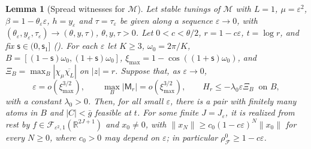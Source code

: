 \documentclass[11pt]{article}
\newtheorem{lemma}[theorem]{Lemma}
\theoremstyle{definition}
\theoremstyle{remark}
\newcommand{\R}{\mathbb R}
\newcommand{\cF}{\mathcal F}
\newcommand{\cM}{\mathcal M}
\newcommand{\norm}[1]{\lVert #1\rVert}
\newcommand{\rhoz}{\rho_{\cF}^{0}}
\begin{document}
\begin{lemma}[Spread witnesses for \(\cM\)]\label{lem:spreadwit}
Let stable tunings of \(\cM\) with \(L=1\), \(\mu=\varepsilon^2\), \(\beta=1-\theta_\varepsilon\varepsilon\), \(h=y_\varepsilon\) and \(\tau=\tau_\varepsilon\) be given along a sequence
\(\varepsilon\to0\), with \((\theta_\varepsilon,y_\varepsilon,\tau_\varepsilon)\to(\theta,y,\tau)\), \(\theta,y,\tau>0\).  Let \(0<c<\theta/2\), \(r=1-c\varepsilon\), \(t=\log r\), and fix
\(\mathsf s\in(0,\mathsf s_1]\) ().  For each \(\varepsilon\) let \(K\ge3\), \(\omega_0=2\pi/K\), \(B=[(1-\mathsf s)\omega_0,(1+\mathsf s)\omega_0]\),
\(\xi_{\max}=1-\cos((1+\mathsf s)\omega_0)\), and \(\Xi_B=\max_B|\chi_\mu\overline{\chi_L}|\) on \(|z|=r\).  Suppose that, as \(\varepsilon\to0\),
\[
\varepsilon=o(\xi_{\max}^{3/2}),\qquad \max_B|\mathsf M_r|=o(\xi_{\max}^{3/2}),\qquad H_r\le-\lambda_0\varepsilon \Xi_B\ \text{ on }B,
\]
with a constant \(\lambda_0>0\).  Then, for all small \(\varepsilon\), there is a pair with finitely many atoms in \(B\) and
\(|C|<\bar g\) feasible at \(t\).  For some finite \(J=J_\varepsilon\), it is realized from rest by
\(f\in\cF_{\varepsilon^2,1}(\R^{2J+1})\) and \(x_0\ne0\), with
\(\norm{x_N}\ge c_0(1-c\varepsilon)^N\norm{x_0}\) for every \(N\ge0\), where \(c_0>0\)
may depend on \(\varepsilon\); in particular \(\rhoz\ge1-c\varepsilon\).
\end{lemma}
\end{document}
